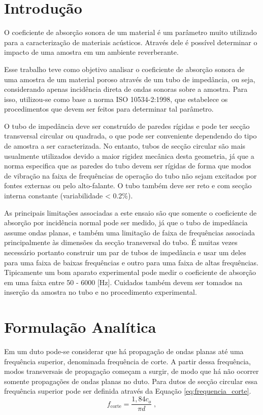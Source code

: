 \chapter{Introdução}
O coeficiente de absorção sonora de um material é um parâmetro muito utilizado para a caracterização de materiais acústicos. Através dele é possível determinar o impacto de uma amostra em um ambiente reverberante.

Esse trabalho teve como objetivo analisar o coeficiente de absorção sonora de uma amostra de um material poroso através de um tubo de impedância, ou seja, considerando apenas incidência direta de ondas sonoras sobre a amostra. Para isso, utilizou-se como base a norma ISO 10534-2:1998, que estabelece os procedimentos que devem ser feitos para determinar tal parâmetro.

O tubo de impedância deve ser construído de paredes rígidas e pode ter secção transversal circular ou quadrada, o que pode ser conveniente dependendo do tipo de amostra a ser caracterizada. No entanto, tubos de secção circular são mais usualmente utilizados devido a maior rigidez mecânica desta geometria, já que a norma especifica que as paredes do tubo devem ser rígidas de forma que modos de vibração na faixa de frequências de operação do tubo não sejam excitados por fontes externas ou pelo alto-falante. O tubo também deve ser reto e com secção interna constante (variabilidade < 0.2\%). 

As principais limitações associadas a este ensaio são que somente o coeficiente de absorção por incidência normal pode ser medido, já que o tubo de impedância assume ondas planas, e também uma limitação de faixa de frequências associada principalmente às dimensões da secção transversal do tubo. É muitas vezes necessário portanto construir um par de tubos de impedância e usar um deles para uma faixa de baixas frequências e outro para uma faixa de altas frequências. Tipicamente um bom aparato experimental pode medir o coeficiente de absorção em uma faixa entre 50 - 6000 [Hz]. Cuidados também devem ser tomados na inserção da amostra no tubo e no procedimento experimental.


\chapter{Formulação Analítica}

Em um duto pode-se considerar que há propagação de ondas planas até uma frequência superior, denominada frequência de corte. A partir dessa frequência, modos transversais de propagação começam a surgir, de modo que há não ocorrer somente propagações de ondas planas no duto. Para dutos de secção circular essa frequência superior pode ser definida através da Equação \ref{eq:frequencia_corte}.
\begin{equation}
f_{\text{corte}}=\frac{1,84c_{o}}{\pi d}\;,
\label{eq:frequencia_corte}
\end{equation}

